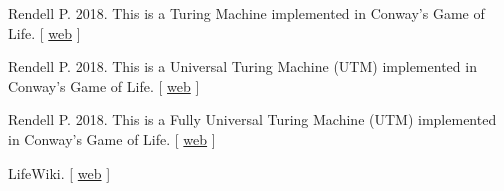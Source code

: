 \documentclass{article}
\begin{document}
\vspace*{0.2cm}


\noindent 
  Rendell P. 2018. This is a Turing Machine implemented in Conway's Game of Life. [
\href{http://rendell-attic.org/gol/tm.htm}{web}
]
  

\vspace*{0.2cm}


\noindent 
  Rendell P. 2018. This is a Universal Turing Machine (UTM) implemented in Conway's Game of Life. [
\href{http://rendell-attic.org/gol/utm/index.htm}{web}
]
  

\vspace*{0.2cm}


\noindent 
  Rendell P. 2018. This is a Fully Universal Turing Machine (UTM) implemented in Conway's Game of Life. [
\href{http://rendell-attic.org/gol/fullutm/index.htm}{web}
]
  

\vspace*{0.2cm}


\noindent 
  LifeWiki. [
\href{http://www.conwaylife.com/wiki/}{web}
]
  

\vspace*{0.2cm}
\end{document}
